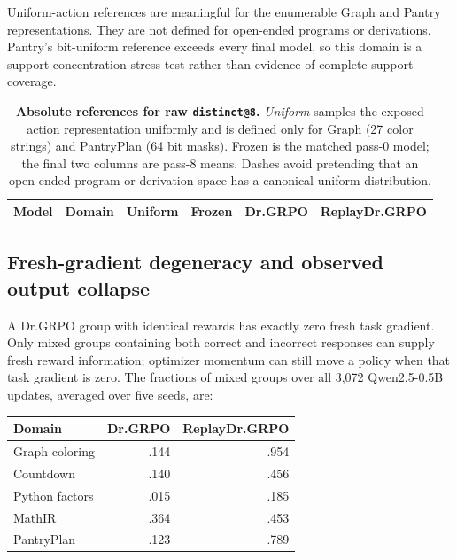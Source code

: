\documentclass{article}
\newcommand{\1}{\mathbf 1}
\theoremstyle{remark}
\theoremstyle{definition}
\theoremstyle{plain}
\begin{document}
Uniform-action references are meaningful for the enumerable Graph and
Pantry representations. They are not defined for open-ended programs or
derivations. Pantry's bit-uniform reference exceeds every final model, so
this domain is a support-concentration stress test rather than evidence
of complete support coverage.

\begin{table}[t]
  \centering
  \caption{\textbf{Absolute references for raw \texttt{distinct@8}.}
  \emph{Uniform} samples the exposed action representation uniformly and is
  defined only for Graph (27 color strings) and PantryPlan (64 bit masks).
  Frozen is the matched pass-0 model; the final two columns are pass-8 means.
  Dashes avoid pretending that an open-ended program or derivation space has a
  canonical uniform distribution.}
  \label{tab:absolute-support-references}
  \scriptsize
  \setlength{\tabcolsep}{4.2pt}
  \begin{tabular}{@{}llrrrr@{}}
    \toprule
    \textbf{Model} & \textbf{Domain} & \textbf{Uniform} & \textbf{Frozen}
      & \textbf{Dr.GRPO} & \textbf{ReplayDr.GRPO} \\
    \midrule
    
  \end{tabular}
\end{table}


\subsection{Fresh-gradient degeneracy and observed output collapse}
\label{app:degenerate-groups}

A Dr.GRPO group with identical rewards has exactly zero fresh task gradient.
Only mixed groups containing both correct and incorrect responses can
supply fresh reward information; optimizer momentum can still move a
policy when that task gradient is zero. The fractions of mixed groups
over all 3,072 Qwen2.5-0.5B updates, averaged over five seeds, are:

\begin{center}
\small
\begin{tabular}{@{}lrr@{}}
\toprule
\textbf{Domain} & \textbf{Dr.GRPO} & \textbf{ReplayDr.GRPO} \\
\midrule
Graph coloring & .144 & .954 \\
Countdown & .140 & .456 \\
Python factors & .015 & .185 \\
MathIR & .364 & .453 \\
PantryPlan & .123 & .789 \\
\bottomrule
\end{tabular}
\end{center}
\end{document}
